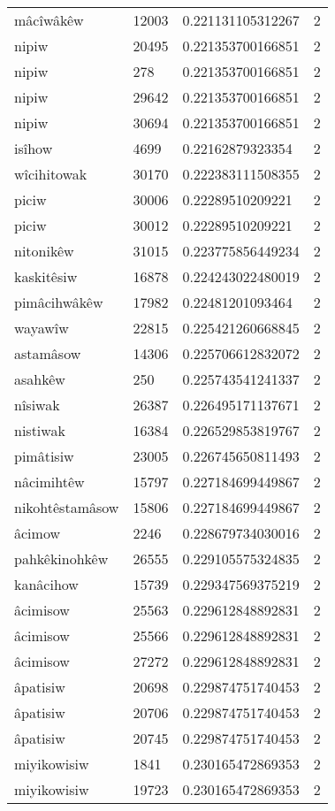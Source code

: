 \begin{longtable}{llll}
mâcîwâkêw & 12003 & 0.221131105312267 & 2 \\
nipiw & 20495 & 0.221353700166851 & 2 \\
nipiw & 278 & 0.221353700166851 & 2 \\
nipiw & 29642 & 0.221353700166851 & 2 \\
nipiw & 30694 & 0.221353700166851 & 2 \\
isîhow & 4699 & 0.22162879323354 & 2 \\
wîcihitowak & 30170 & 0.222383111508355 & 2 \\
piciw & 30006 & 0.22289510209221 & 2 \\
piciw & 30012 & 0.22289510209221 & 2 \\
nitonikêw & 31015 & 0.223775856449234 & 2 \\
kaskitêsiw & 16878 & 0.224243022480019 & 2 \\
pimâcihwâkêw & 17982 & 0.22481201093464 & 2 \\
wayawîw & 22815 & 0.225421260668845 & 2 \\
astamâsow & 14306 & 0.225706612832072 & 2 \\
asahkêw & 250 & 0.225743541241337 & 2 \\
nîsiwak & 26387 & 0.226495171137671 & 2 \\
nistiwak & 16384 & 0.226529853819767 & 2 \\
pimâtisiw & 23005 & 0.226745650811493 & 2 \\
nâcimihtêw & 15797 & 0.227184699449867 & 2 \\
nikohtêstamâsow & 15806 & 0.227184699449867 & 2 \\
âcimow & 2246 & 0.228679734030016 & 2 \\
pahkêkinohkêw & 26555 & 0.229105575324835 & 2 \\
kanâcihow & 15739 & 0.229347569375219 & 2 \\
âcimisow & 25563 & 0.229612848892831 & 2 \\
âcimisow & 25566 & 0.229612848892831 & 2 \\
âcimisow & 27272 & 0.229612848892831 & 2 \\
âpatisiw & 20698 & 0.229874751740453 & 2 \\
âpatisiw & 20706 & 0.229874751740453 & 2 \\
âpatisiw & 20745 & 0.229874751740453 & 2 \\
miyikowisiw & 1841 & 0.230165472869353 & 2 \\
miyikowisiw & 19723 & 0.230165472869353 & 2 \\

\end{longtable}
